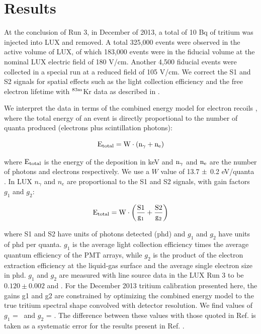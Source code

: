 \section{Results}

At the conclusion of Run 3, in December of 2013, a total of 10 Bq of tritium was injected into LUX and removed. A total 325,000 events were observed in the active volume of LUX, of which 183,000 events were in the fiducial volume at the nominal LUX electric field of 180 V/cm. Another 4,500 fiducial events were collected in a special run at a reduced field of 105 V/cm. We correct the S1 and S2 signals for spatial effects such as the light collection efficiency and the free electron lifetime with $\rm ^{83m}$Kr data as described in \cite{lux-reanalysis}. 


We interpret the data in terms of the combined energy model for electron recoils \cite{Platzman}, where the total energy of an event is directly proportional to the number of quanta produced (electrons plus scintillation photons):

\begin{equation}
\rm E_{total} = W \cdot (n_{\gamma} + n_e )
\label{platzman_eq}
\end{equation}

\noindent
where $\rm E_{total}$ is the energy of the deposition in keV and  $\rm n_\gamma$ and $\rm n_e$ are the number of photons and electrons respectively. We use a $W$ value of 13.7 $\rm \pm$ 0.2 eV/quanta \cite{Dahl_Thesis}. In LUX $n_{\gamma}$ and $n_e$ are proportional to the S1 and S2 signals, with gain factors $g_1$ and $g_2$: 

\begin{equation}
\rm E_{total} = W \cdot \left(\frac{S1}{g_1} + \frac{S2}{g_2} \right)
\label{energy_eq}
\end{equation}

\noindent
where S1 and S2 have units of photons detected (phd) and $g_1$ and $g_2$ have units of phd per quanta. $g_1$ is the average light collection efficiency times the average quantum efficiency of the PMT arrays, while $g_2$ is the product of the electron extraction efficiency at the liquid-gas surface and the average single electron size in phd. $g_1$ and $g_2$ are measured with line source data in the LUX Run 3 to be $0.120 \pm 0.002$ and \cite{lux-reanalysis, lux-prd}. For the December 2013 tritium calibration presented here, the gains g1 and g2 are constrained by optimizing the combined energy model to the true tritium spectral shape \cite{Tritium_Eq_Simpson} convolved with detector resolution. We find values of $g_1$ = \gone  ~and  $g_2$ = \gtwo.  The difference between these values with those quoted in Ref. \cite{lux-reanalysis, lux-prd} is taken as a systematic error for the results present in Ref. \cite{lux-reanalysis, lux-prd}.

